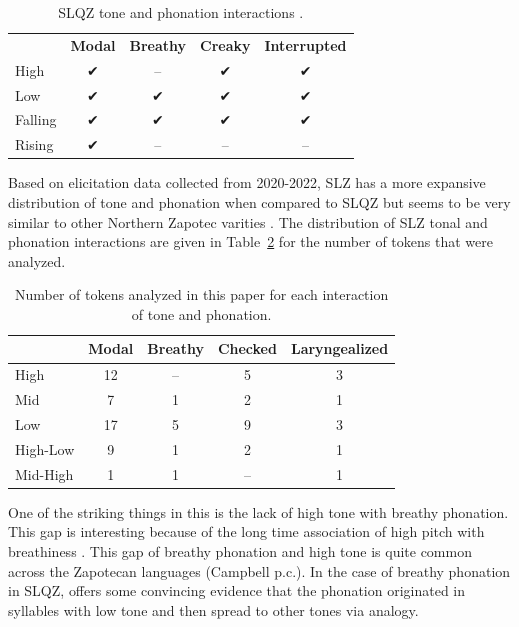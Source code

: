 \documentclass[12pt, letterpaper]{article}
\providecommand{\lsptoprule}{\midrule\toprule}
\providecommand{\lspbottomrule}{\bottomrule\midrule}
\begin{document}
\begin{table}[!ht]
	\centering
	\caption{SLQZ tone and phonation interactions \citep{chavez-peonInteractionMetricalStructure2010}.}
	\label{tab:SLQZ}
	 \begin{tabular}{lcccc}
	  \lsptoprule
					  &	 \textbf{Modal}  & \textbf{Breathy} & \textbf{Creaky} & \textbf{Interrupted} \\
		  High	& ✔︎ & -- & ✔︎ & ✔︎ \\
		  Low & ✔︎ & ✔︎ & ✔︎ & ✔︎ \\
		  Falling & ✔︎ & ✔︎ & ✔︎ & ✔︎ \\
		  Rising & ✔︎ & -- & -- & -- \\
	  \lspbottomrule
	 \end{tabular}
\end{table}

Based on elicitation data collected from 2020-2022, SLZ has a more expansive distribution of tone and phonation when compared to SLQZ but seems to be very similar to other Northern Zapotec varities \citep[e.g.,][]{avelinobecerraTopicsYalalagZapotec2004}. The distribution of SLZ tonal and phonation interactions are given in Table~\ref{tab:ToneVoiceQuality} for the number of tokens that were analyzed. 
\begin{table}[!h]
	\caption{Number of tokens analyzed in this paper for each interaction of tone and phonation.}
	\label{tab:ToneVoiceQuality}
	\centering

	\begin{tabular}{lcccc}
	\lsptoprule
		& \textbf{Modal} & \textbf{Breathy} & \textbf{Checked} & \textbf{Laryngealized} \\
	\hline
	High		& 12 & -- & 5	& 3 \\
	Mid			& 7 & 1  & 2	& 1 \\
	Low			& 17 & 5  & 9	& 3 \\
	High-Low	& 9 & 1  & 2	& 1 \\
	Mid-High	& 1	 & 1  & --	& 1 \\
	\lspbottomrule
	\end{tabular}
\end{table}

One of the striking things in this is the lack of high tone with breathy phonation. This gap is interesting because of the long time association of high pitch with breathiness \citep[a good overview–of this association and other phoantion types–is found in][]{eslingVoiceQualityLaryngeal2019}. This gap of breathy phonation and high tone is quite common across the Zapotecan languages (Campbell p.c.). In the case of breathy phonation in SLQZ, \citet{uchiharaToneRegistrogenesisQuiavini2016} offers some convincing evidence that the phonation originated in syllables with low tone and then spread to other tones via analogy. 
\end{document}

